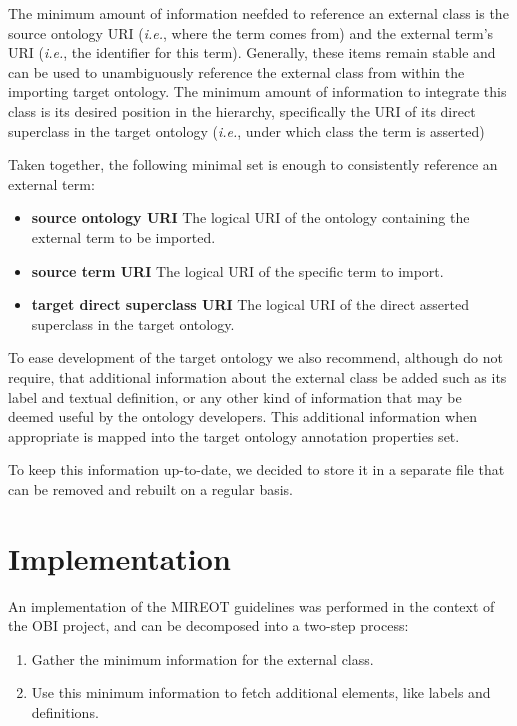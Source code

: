 \documentclass{ao2e}%
\begin{document}
The minimum amount of information neefded to reference an external class is the source ontology URI (\textit {i.e.}, where the term comes from) and the external term's URI (\textit {i.e.}, the identifier for this term). 
Generally, these items remain stable and can be used to unambiguously reference the external class from within the importing target ontology.
The minimum amount of information to integrate this class is its desired position in the hierarchy, specifically the URI of its direct superclass in the target ontology (\textit {i.e.}, under which class the term is asserted)

Taken together, the following minimal set is enough to consistently reference an external term:
\begin{itemize}
 \item \textbf{source ontology URI} The logical URI of the ontology containing the external term to be imported. 
 \item \textbf{source term URI} The logical URI of the specific term to import. 
 \item \textbf{target direct superclass URI} The logical URI of the direct asserted superclass in the target ontology.
\end{itemize} 

To ease development of the target ontology we also recommend, although do not require, that additional information about the external class be added such as its label and textual definition, or any other kind of information that may be deemed useful by the ontology developers.
This additional information when appropriate is mapped into the target ontology annotation properties set.

To keep this information up-to-date, we decided to store it in a separate file that can be removed and rebuilt on a regular basis.


\section{Implementation}

An implementation of the \ac{MIREOT} guidelines was performed in the context of the \ac{OBI} project, and can be decomposed into a two-step process:

\begin{enumerate}
\item Gather the minimum information for the external class.
\item Use this minimum information to fetch additional elements, like labels and definitions.
\end{enumerate}
\end{document}
